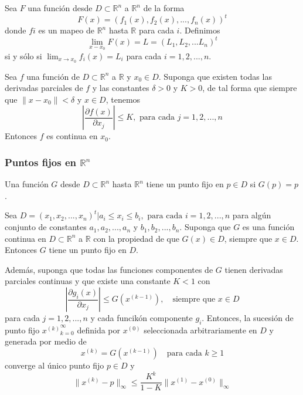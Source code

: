 \begin{definition}
    Sea $F$ una función desde $D \subset \mathbb{R}^n$ a $\mathbb{R}^n$ de la forma
    \[ F(x) = (f_1(x), f_2(x), ..., f_n(x))^t \]
    donde $fi$ es un mapeo de $\mathbb{R}^n$ hasta $\mathbb{R}$ para cada $i$. Definimos
    \[ \lim_{x - x_0} F(x) = L = (L_1, L_2, ...L_n)^t \]
    si y sólo si $\lim_{x \rightarrow x_0} f_i(x) = L_i$ para cada $i = 1, 2, ..., n$.
\end{definition}

\begin{theorem}
    Sea $f$ una función de $D \subset \mathbb{R}^n$ a $\mathbb{R}$ y $x_0 \in D$. Suponga que existen todas las derivadas parciales de $f$ y las constantes $\delta > 0$ y $K > 0$, de tal forma que siempre que $\| x - x_0 \| < \delta $ y $x \in D$, tenemos
    \[ \left| \frac{\partial f(x)}{\partial x_j} \right| \leq K, \text{ para cada } j = 1, 2, ..., n\]
    Entonces $f$ es continua en $x_0$.
\end{theorem}

\subsubsection{Puntos fijos en $\mathbb{R}^n$}

\begin{definition}
    Una función $G$ desde $D \subset \mathbb{R}^n$ hasta $\mathbb{R}^n$ tiene un punto  fijo en $p \in D$ si $G(p) = p$.
\end{definition}

\begin{theorem}
    Sea $D = {(x_1, x_2, ..., x_n)^t | a_i \leq x_i \leq b_i, \text{ para cada } i = 1, 2, ..., n}$ para algún conjunto de constantes $a_1, a_2, ..., a_n$ y $b_1, b_2, ..., b_n$. Suponga que $G$ es una función continua en $D \subset \mathbb{R}^n$ a $\mathbb{R}$ con la propiedad de que $G(x) \in D$, siempre que $x \in D$. Entonces $G$ tiene un punto fijo en $D$.

    Además, suponga que todas las funciones componentes de $G$ tienen derivadas parciales continuas y que existe una constante $K < 1$ con
    \[ \left| \frac{\partial g_i(x)}{\partial x_j} \right| \leq G(x^{(k - 1)}), \quad \text{siempre que } x \in D \]
    para cada $j = 1, 2, ..., n$ y cada funcikón componente $g_i$. Entonces, la sucesión de punto fijo ${x^{(k)}}_{k = 0}^\infty$ definida por $x^{(0)}$ seleccionada arbitrariamente en $D$ y generada por medio de 
    \[ x^{(k)} = G(x^{(k - 1)}) \quad \text{para cada } k \geq 1 \]
    converge al único punto fijo $p \in D$ y 
    \begin{equation}
        \| x^{(k)} - p\|_\infty \leq \frac{K^k}{1 - K} \| x^{(1)} - x^{(0)} \|_\infty 
    \end{equation}
\end{theorem}

